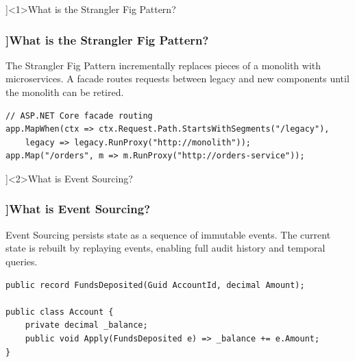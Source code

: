 \QuestionSlide[\CategoryBadge[MicroColor!20]{Microservices}]<1>{What is the Strangler Fig Pattern?}

\begin{frame}[fragile]
  \frametitle{\AnswerTitle[\CategoryBadge[MicroColor!20]{Microservices}]{What is the Strangler Fig Pattern?}}

  {\footnotesize
  The Strangler Fig Pattern incrementally replaces pieces of a monolith with microservices. A facade routes requests between legacy and new components until the monolith can be retired.
  }

  \begin{verbatim}
// ASP.NET Core facade routing
app.MapWhen(ctx => ctx.Request.Path.StartsWithSegments("/legacy"),
    legacy => legacy.RunProxy("http://monolith"));
app.Map("/orders", m => m.RunProxy("http://orders-service"));
  \end{verbatim}
\end{frame}

\QuestionSlide[\CategoryBadge[MicroColor!20]{Microservices}]<2>{What is Event Sourcing?}

\begin{frame}[fragile]
  \frametitle{\AnswerTitle[\CategoryBadge[MicroColor!20]{Microservices}]{What is Event Sourcing?}}

  {\footnotesize
  Event Sourcing persists state as a sequence of immutable events. The current state is rebuilt by replaying events, enabling full audit history and temporal queries.
  }

  \begin{verbatim}
public record FundsDeposited(Guid AccountId, decimal Amount);

public class Account {
    private decimal _balance;
    public void Apply(FundsDeposited e) => _balance += e.Amount;
}
  \end{verbatim}
\end{frame}
